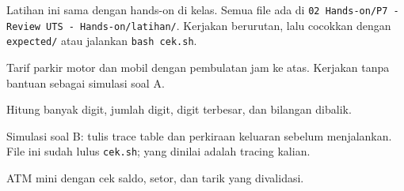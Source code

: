 \documentclass[a4paper]{article}
\begin{document}
Latihan ini sama dengan hands-on di kelas. Semua file ada di \texttt{02 Hands-on/P7 - Review UTS - Hands-on/latihan/}. Kerjakan berurutan, lalu cocokkan dengan \texttt{expected/} atau jalankan \texttt{bash cek.sh}.
\par\vspace{4pt}\par\vspace{6pt}
Tarif parkir motor dan mobil dengan pembulatan jam ke atas. Kerjakan tanpa bantuan sebagai simulasi soal A.

Hitung banyak digit, jumlah digit, digit terbesar, dan bilangan dibalik.

Simulasi soal B: tulis trace table dan perkiraan keluaran sebelum menjalankan. File ini sudah lulus \texttt{cek.sh}; yang dinilai adalah tracing kalian.

ATM mini dengan cek saldo, setor, dan tarik yang divalidasi.
\end{document}

